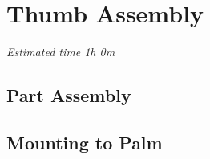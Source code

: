 
\chapter{Thumb Assembly}  %

\label {Thumb Assembly} 
%
%

\textit{Estimated time 1h 0m}

\section{Part Assembly}

\section{Mounting to Palm}